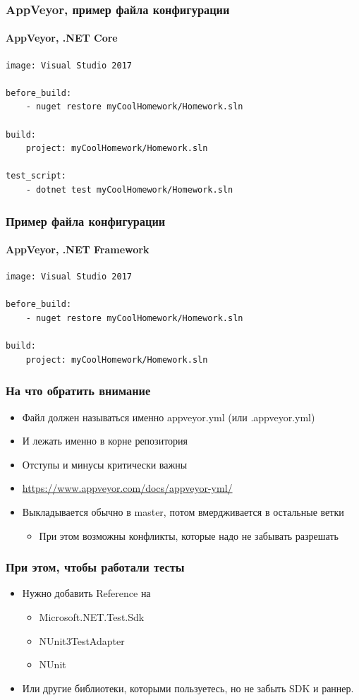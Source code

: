 \documentclass[xetex,mathserif,serif]{beamer}
\begin{document}
	\begin{frame}[fragile]
		\frametitle{AppVeyor, пример файла конфигурации}
		\framesubtitle{AppVeyor, .NET Core}
		\begin{verbatim}
image: Visual Studio 2017 

before_build: 
    - nuget restore myCoolHomework/Homework.sln

build: 
    project: myCoolHomework/Homework.sln

test_script: 
    - dotnet test myCoolHomework/Homework.sln
		\end{verbatim}
	\end{frame}

	\begin{frame}[fragile]
		\frametitle{Пример файла конфигурации}
		\framesubtitle{AppVeyor, .NET Framework}
		\begin{verbatim}
image: Visual Studio 2017 

before_build: 
    - nuget restore myCoolHomework/Homework.sln

build: 
    project: myCoolHomework/Homework.sln
		\end{verbatim}
	\end{frame}

	\begin{frame}
		\frametitle{На что обратить внимание}
		\begin{itemize}
			\item Файл должен называться именно appveyor.yml (или .appveyor.yml)
			\item И лежать именно в корне репозитория
			\item Отступы и минусы критически важны
			\item \url{https://www.appveyor.com/docs/appveyor-yml/}
			\item Выкладывается обычно в master, потом вмердживается в остальные ветки
			\begin{itemize}
				\item При этом возможны конфликты, которые надо не забывать разрешать
			\end{itemize}
		\end{itemize}
	\end{frame}

	\begin{frame}
		\frametitle{При этом, чтобы работали тесты}
		\begin{itemize}
			\item Нужно добавить Reference на
			\begin{itemize}
				\item Microsoft.NET.Test.Sdk
				\item NUnit3TestAdapter
				\item NUnit
			\end{itemize}
			\item Или другие библиотеки, которыми пользуетесь, но не забыть SDK и раннер.
		\end{itemize}
	\end{frame}
\end{document}
